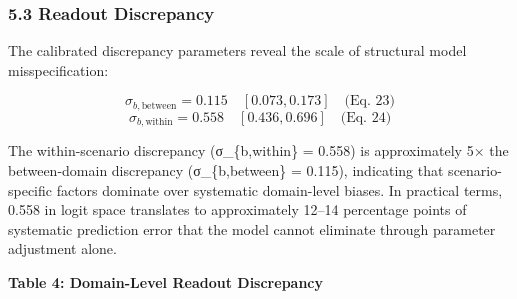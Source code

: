 \documentclass[
]{article}
\begin{document}
\subsubsection{5.3 Readout Discrepancy}\label{readout-discrepancy-1}

The calibrated discrepancy parameters reveal the scale of structural
model misspecification:

\[\sigma_{b,\text{between}} = 0.115 \quad [0.073, 0.173] \quad \text{(Eq. 23)}\]
\[\sigma_{b,\text{within}} = 0.558 \quad [0.436, 0.696] \quad \text{(Eq. 24)}\]

The within-scenario discrepancy (σ\_\{b,within\} = 0.558) is
approximately 5× the between-domain discrepancy (σ\_\{b,between\} =
0.115), indicating that scenario-specific factors dominate over
systematic domain-level biases. In practical terms, 0.558 in logit space
translates to approximately 12--14 percentage points of systematic
prediction error that the model cannot eliminate through parameter
adjustment alone.

\textbf{Table 4: Domain-Level Readout Discrepancy}
\end{document}
